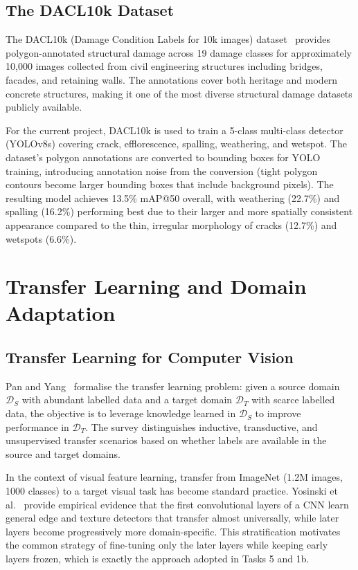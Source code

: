 \documentclass[12pt,a4paper]{article}
\begin{document}
\subsection{The DACL10k Dataset}

The DACL10k (Damage Condition Labels for 10k images) dataset~\cite{surv:benz2022dacl10k} provides polygon-annotated structural damage across 19 damage classes for approximately 10{,}000 images collected from civil engineering structures including bridges, facades, and retaining walls. The annotations cover both heritage and modern concrete structures, making it one of the most diverse structural damage datasets publicly available.

For the current project, DACL10k is used to train a 5-class multi-class detector (YOLOv8s) covering crack, efflorescence, spalling, weathering, and wetspot. The dataset's polygon annotations are converted to bounding boxes for YOLO training, introducing annotation noise from the conversion (tight polygon contours become larger bounding boxes that include background pixels). The resulting model achieves 13.5\% mAP@50 overall, with weathering (22.7\%) and spalling (16.2\%) performing best due to their larger and more spatially consistent appearance compared to the thin, irregular morphology of cracks (12.7\%) and wetspots (6.6\%).

\section{Transfer Learning and Domain Adaptation}
\label{surv:sec:transfer}

\subsection{Transfer Learning for Computer Vision}

Pan and Yang~\cite{surv:pan2010transfer} formalise the transfer learning problem: given a source domain $\mathcal{D}_S$ with abundant labelled data and a target domain $\mathcal{D}_T$ with scarce labelled data, the objective is to leverage knowledge learned in $\mathcal{D}_S$ to improve performance in $\mathcal{D}_T$. The survey distinguishes inductive, transductive, and unsupervised transfer scenarios based on whether labels are available in the source and target domains.

In the context of visual feature learning, transfer from ImageNet (1.2M images, 1000 classes) to a target visual task has become standard practice. Yosinski et al.~\cite{surv:yosinski2014transferable} provide empirical evidence that the first convolutional layers of a CNN learn general edge and texture detectors that transfer almost universally, while later layers become progressively more domain-specific. This stratification motivates the common strategy of fine-tuning only the later layers while keeping early layers frozen, which is exactly the approach adopted in Tasks 5 and 1b.
\end{document}
